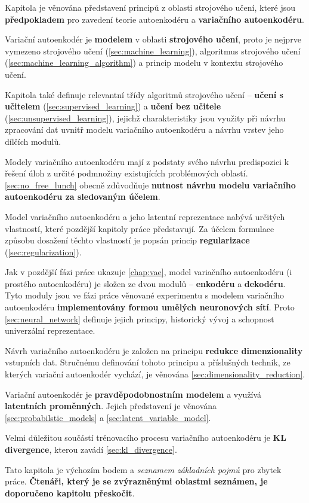 Kapitola je věnována představení principů z oblasti strojového učení,
které jsou \textbf{předpokladem} pro zavedení teorie autoenkodéru a \textbf{variačního autoenkodéru}.

Variační autoenkodér je \textbf{modelem} v oblasti \textbf{strojového učení}, proto je nejprve vymezeno strojového učení (\autoref{sec:machine_learning}), algoritmus strojového učení (\autoref{sec:machine_learning_algorithm}) a princip modelu v kontextu strojového učení.

Kapitola také definuje relevantní třídy algoritmů strojového učení – \textbf{učení s učitelem} (\autoref{sec:supervised_learning}) a \textbf{učení bez učitele} (\autoref{sec:unsupervised_learning}), jejichž charakteristiky jsou využity při návrhu zpracování dat uvnitř modelu variačního autoenkodéru a návrhu vrstev jeho dílčích modulů.

Modely variačního autoenkodéru mají z podstaty svého návrhu predispozici k řešení úloh z určité podmnožiny existujících problémových oblastí.
\autoref{sec:no_free_lunch} obecně zdůvodňuje \textbf{nutnost návrhu modelu variačního autoenkodéru za sledovaným účelem}.

Model variačního autoenkodéru a jeho latentní reprezentace nabývá určitých vlastností, které pozdější kapitoly práce představují.
Za účelem formulace způsobu dosažení těchto vlastností je popsán princip \textbf{regularizace} (\autoref{sec:regularization}).

Jak v pozdější fázi práce ukazuje \autoref{chap:vae}, model variačního autoenkodéru (i prostého autoenkodéru) je složen ze dvou modulů – \textbf{enkodéru} a \textbf{dekodéru}.
Tyto moduly jsou ve fázi práce věnované experimentu s modelem variačního autoenkodéru \textbf{implementovány formou umělých neuronových sítí}. Proto \autoref{sec:neural_network} definuje jejich principy, historický vývoj a schopnost univerzální reprezentace.

Návrh variačního autoenkodéru je založen na principu \textbf{redukce dimenzionality} vstupních dat.
Stručnému definování tohoto principu a příslušných technik, ze kterých variační autoenkodér vychází, je věnována \autoref{sec:dimensionality_reduction}.

Variační autoenkodér je \textbf{pravděpodobnostním modelem} a využívá \textbf{latentních proměnných}.
Jejich představení je věnována \autoref{sec:probabilstic_models} a \autoref{sec:latent_variable_model}.

Velmi důležitou součástí trénovacího procesu variačního autoenkodéru je \textbf{KL divergence}, kterou zavádí \autoref{sec:kl_divergence}.

Tato kapitola je výchozím bodem a \emph{seznamem základních pojmů} pro zbytek práce.
\textbf{Čtenáři, který je se zvýrazněnými oblastmi seznámen, je doporučeno kapitolu přeskočit}.